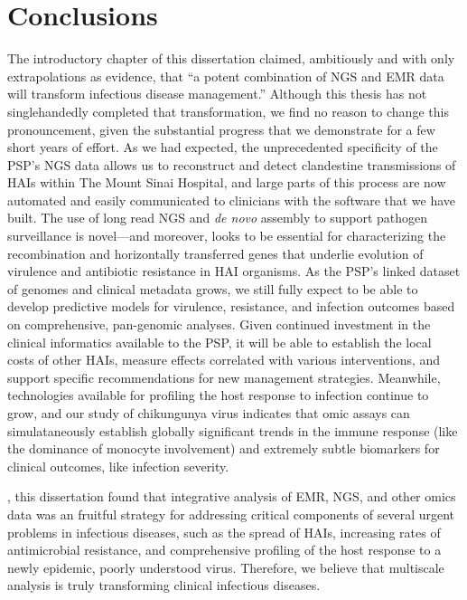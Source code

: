 \section{Conclusions}

The introductory chapter of this dissertation claimed, ambitiously and with only extrapolations as evidence, that ``a potent combination of NGS and EMR data will transform infectious disease management.'' Although this thesis has not singlehandedly completed that transformation, we find no reason to change this pronouncement, given the substantial progress that we demonstrate for a few short years of effort. As we had expected, the unprecedented specificity of the PSP's NGS data allows us to reconstruct and detect clandestine transmissions of HAIs within The Mount Sinai Hospital, and large parts of this process are now automated and easily communicated to clinicians with the software that we have built. The use of long read NGS and \emph{de novo} assembly to support pathogen surveillance is novel—and moreover, looks to be essential for characterizing the recombination and horizontally transferred genes that underlie evolution of virulence and antibiotic resistance in HAI organisms. As the PSP's linked dataset of genomes and clinical metadata grows, we still fully expect to be able to develop predictive models for virulence, resistance, and infection outcomes based on comprehensive, pan-genomic analyses. Given continued investment in the clinical informatics available to the PSP, it will be able to establish the local costs of other HAIs, measure effects correlated with various interventions, and support specific recommendations for new management strategies. Meanwhile, technologies available for profiling the host response to infection continue to grow, and our study of chikungunya virus indicates that omic assays can simulataneously establish globally significant trends in the immune response (like the dominance of monocyte involvement) and extremely subtle biomarkers for clinical outcomes, like infection severity.

, this dissertation found that integrative analysis of EMR, NGS, and other omics data was an fruitful strategy for addressing critical components of several urgent problems in infectious diseases, such as the spread of HAIs, increasing rates of antimicrobial resistance, and comprehensive profiling of the host response to a newly epidemic, poorly understood virus. Therefore, we believe that multiscale analysis is truly transforming clinical infectious diseases.